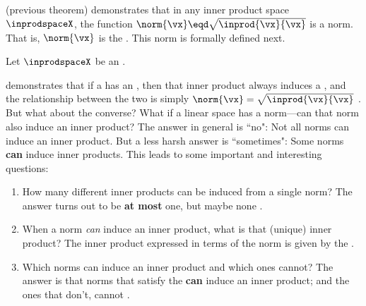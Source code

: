  (previous theorem)
demonstrates that in any inner product space\\$\inprodspaceX$,
the function $\norm{\vx}\eqd\sqrt{\inprod{\vx}{\vx}}$ is a norm.
That is, $\norm{\vx}$ is the .
This norm is formally defined next.
\begin{definition}
\label{def:norm=inprod}
\label{def:innorm}
Let $\inprodspaceX$ be an  .
\end{definition}

 demonstrates that if a   has an  ,
then that inner product always induces a  ,
and the relationship between the two is simply $\norm{\vx}=\sqrt{\inprod{\vx}{\vx}}$ .
But what about the converse?
What if a linear space has a norm---can that norm also induce an inner product?
The answer in general is ``no":
Not all norms can induce an inner product.
But a less harsh answer is ``sometimes":
Some norms {\bf can} induce inner products.
This leads to some important and interesting questions:
\begin{enumerate}
  \item How many different inner products can be induced from a single norm?
    The answer turns out to be {\bf at most} one, but maybe none .

  \item When a norm \emph{can} induce an inner product, what is that (unique) inner product?
  The inner product expressed in terms of the norm is given by the
   .

  \item Which norms can induce an inner product and which ones cannot?
    The answer is that norms that satisfy the 
     {\bf can} induce an inner product;
    and the ones that don't, cannot .
\end{enumerate}


